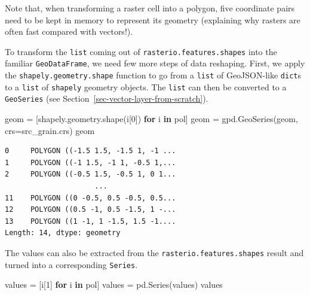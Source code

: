\documentclass[
  letterpaper,
]{krantz}
\newenvironment{Shaded}{\begin{snugshade}}{\end{snugshade}}
\newcommand{\ControlFlowTok}[1]{\textcolor[rgb]{0.00,0.23,0.31}{\textbf{#1}}}
\newcommand{\DecValTok}[1]{\textcolor[rgb]{0.68,0.00,0.00}{#1}}
\newcommand{\KeywordTok}[1]{\textcolor[rgb]{0.00,0.23,0.31}{\textbf{#1}}}
\newcommand{\NormalTok}[1]{\textcolor[rgb]{0.00,0.23,0.31}{#1}}
\newcommand{\OperatorTok}[1]{\textcolor[rgb]{0.37,0.37,0.37}{#1}}
\begin{document}
\begin{tcolorbox}[enhanced jigsaw, title=\textcolor{quarto-callout-note-color}{\faInfo}\hspace{0.5em}{Note}, coltitle=black, colbacktitle=quarto-callout-note-color!10!white, breakable, titlerule=0mm, colframe=quarto-callout-note-color-frame, opacitybacktitle=0.6, colback=white, bottomrule=.15mm, left=2mm, leftrule=.75mm, toprule=.15mm, toptitle=1mm, bottomtitle=1mm, arc=.35mm, opacityback=0, rightrule=.15mm]

Note that, when transforming a raster cell into a polygon, five
coordinate pairs need to be kept in memory to represent its geometry
(explaining why rasters are often fast compared with vectors!).

\end{tcolorbox}

To transform the \texttt{list} coming out of
\texttt{rasterio.features.shapes} into the familiar
\texttt{GeoDataFrame}, we need few more steps of data reshaping. First,
we apply the \texttt{shapely.geometry.shape} function to go from a
\texttt{list} of GeoJSON-like \texttt{dict}s to a \texttt{list} of
\texttt{shapely} geometry objects. The \texttt{list} can then be
converted to a \texttt{GeoSeries} (see
Section~\ref{sec-vector-layer-from-scratch}).

\begin{Shaded}
\begin{Highlighting}[]
\NormalTok{geom }\OperatorTok{=}\NormalTok{ [shapely.geometry.shape(i[}\DecValTok{0}\NormalTok{]) }\ControlFlowTok{for}\NormalTok{ i }\KeywordTok{in}\NormalTok{ pol]}
\NormalTok{geom }\OperatorTok{=}\NormalTok{ gpd.GeoSeries(geom, crs}\OperatorTok{=}\NormalTok{src\_grain.crs)}
\NormalTok{geom}
\end{Highlighting}
\end{Shaded}

\begin{verbatim}
0     POLYGON ((-1.5 1.5, -1.5 1, -1 ...
1     POLYGON ((-1 1.5, -1 1, -0.5 1,...
2     POLYGON ((-0.5 1.5, -0.5 1, 0 1...
                     ...                
11    POLYGON ((0 -0.5, 0.5 -0.5, 0.5...
12    POLYGON ((0.5 -1, 0.5 -1.5, 1 -...
13    POLYGON ((1 -1, 1 -1.5, 1.5 -1....
Length: 14, dtype: geometry
\end{verbatim}

The values can also be extracted from the
\texttt{rasterio.features.shapes} result and turned into a corresponding
\texttt{Series}.

\begin{Shaded}
\begin{Highlighting}[]
\NormalTok{values }\OperatorTok{=}\NormalTok{ [i[}\DecValTok{1}\NormalTok{] }\ControlFlowTok{for}\NormalTok{ i }\KeywordTok{in}\NormalTok{ pol]}
\NormalTok{values }\OperatorTok{=}\NormalTok{ pd.Series(values)}
\NormalTok{values}
\end{Highlighting}
\end{Shaded}
\end{document}
